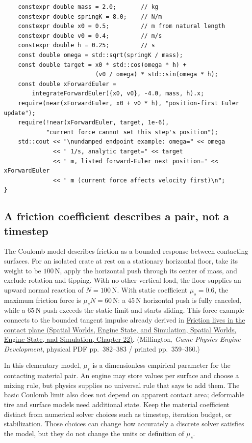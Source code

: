 \begin{verbatim}
    constexpr double mass = 2.0;       // kg
    constexpr double springK = 8.0;    // N/m
    constexpr double x0 = 0.5;         // m from natural length
    constexpr double v0 = 0.4;         // m/s
    constexpr double h = 0.25;         // s
    const double omega = std::sqrt(springK / mass);
    const double target = x0 * std::cos(omega * h) +
                          (v0 / omega) * std::sin(omega * h);
    const double xForwardEuler =
        integrateForwardEuler({x0, v0}, -4.0, mass, h).x;
    require(near(xForwardEuler, x0 + v0 * h), "position-first Euler update");
    require(!near(xForwardEuler, target, 1e-6),
            "current force cannot set this step's position");
    std::cout << "\nundamped endpoint example: omega=" << omega
              << " 1/s, analytic target=" << target
              << " m, listed forward-Euler next position=" << xForwardEuler
              << " m (current force affects velocity first)\n";
}
\end{verbatim}

\subsection{A friction coefficient describes a pair, not a timestep}\label{06-engine-ii-ch047-a-friction-coefficient-describes-a-pair-not-a-timestep}

The Coulomb model describes friction as a bounded response between contacting surfaces. For an isolated crate at rest on a stationary horizontal floor, take its weight to be \(100\,\mathrm N\), apply the horizontal push through its center of mass, and exclude rotation and tipping. With no other vertical load, the floor supplies an upward normal reaction of \(N=100\,\mathrm N\). With static coefficient \(\mu_s=0.6\), the maximum friction force is \(\mu_sN=60\,\mathrm N\): a \(45\,\mathrm N\) horizontal push is fully canceled, while a \(65\,\mathrm N\) push exceeds the static limit and starts sliding. This force example connects to the bounded tangent impulse already derived in \href{../05-Spatial-Worlds-Engine-State-and-Simulation/main.pdf\#nameddest=06-engine-ii-ch033-friction-lives-in-the-contact-plane}{Friction lives in the contact plane (Spatial Worlds, Engine State, and Simulation, Spatial Worlds, Engine State, and Simulation, Chapter 22)}. (Millington, \emph{Game Physics Engine Development}, physical PDF pp.~382--383 / printed pp.~359--360.)

In this elementary model, \(\mu_s\) is a dimensionless empirical parameter for the contacting material pair. An engine may store values per surface and choose a mixing rule, but physics supplies no universal rule that says to add them. The basic Coulomb limit also does not depend on apparent contact area; deformable tire and surface models need additional state. Keep the material coefficient distinct from numerical solver choices such as timestep, iteration budget, or stabilization. Those choices can change how accurately a discrete solver satisfies the model, but they do not change the units or definition of \(\mu_s\).

